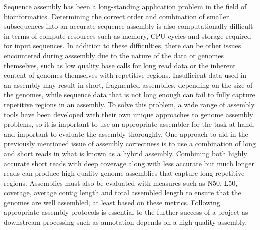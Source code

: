 \documentclass[12pt]{article}
\begin{document}
Sequence assembly has been a long-standing application problem in the
field of bioinformatics\cite{assembly}. Determining the correct order
and combination of smaller subsequences into an accurate sequence
assembly is also computationally difficult in terms of compute
resources such as memory, CPU cycles and storage required for input
sequences\cite{assembly}. In addition to these difficulties, there can
be other issues encountered during asssembly due to the nature of the
data or genomes themselves, such as low quality base calls for long
read data or the inherent content of genomes themselves with
repetitive regions. Insufficient data used in an assembly may result
in short, fragmented assemblies, depending on the size of the genomes,
while sequence data that is not long enough can fail to fully capture
repetitive regions in an assembly. To solve this problem, a wide range
of assembly tools have been developed with their own unique approaches
to genome assembly problems, so it is important to use an appropriate
assembler for the task at hand, and important to evaluate the assembly
thoroughly. One approach to aid in the previously mentioned issue of
assembly correctness is to use a combination of long and short reads
in what is known as a hybrid assembly. Combining both highly accurate
short reads with deep coverage along with less accurate but much
longer reads can produce high quality genome assemblies that capture
long repetitive regions. Assemblies must also be evaluated with
measures such as N50, L50, coverage, average contig length and total
assembled length to ensure that the genomes are well assembled, at
least based on these metrics\cite{assembly}. Following appropriate
assembly protocols is essential to the further success of a project as
downstream processing such as annotation depends on a high-quality
assembly.
\end{document}
